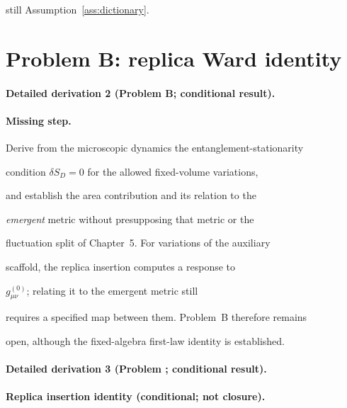 still Assumption~\ref{ass:dictionary}.



\section{Problem B: replica Ward identity}

\label{sec:status-B}



\paragraph{Detailed derivation 2 (Problem B; conditional result).} \label{ref:detail-1} %



\paragraph{Missing step.}

Derive from the microscopic dynamics the entanglement-stationarity

condition \(\delta S_D=0\) for the allowed fixed-volume variations,

and establish the area contribution and its relation to the

\emph{emergent} metric without presupposing that metric or the

fluctuation split of Chapter~5. For variations of the auxiliary

scaffold, the replica insertion computes a response to

\(g^{(0)}_{\mu\nu}\); relating it to the emergent metric still

requires a specified map between them. Problem~B therefore remains

open, although the fixed-algebra first-law identity is established.



\paragraph{Detailed derivation 3 (Problem ; conditional result).} \label{ref:detail-2} %



\paragraph{Replica insertion identity (conditional; not closure).}

